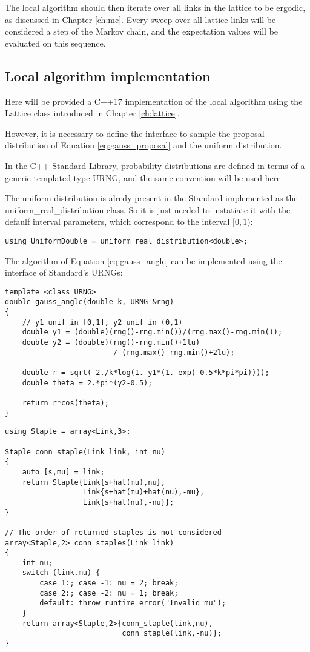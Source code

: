 The local algorithm should then iterate over all links in the lattice to be ergodic, as discussed in Chapter \ref{ch:mc}.
Every sweep over all lattice links will be considered a step of the Markov chain,
and the expectation values will be evaluated on this sequence.

\subsection*{Local algorithm implementation}
Here will be provided a C++17 implementation of the local algorithm using the {\ttfamily Lattice class} introduced in Chapter \ref{ch:lattice}.

However, it is necessary to define the interface to sample the proposal distribution of Equation \eqref{eq:gauss_proposal} and the uniform distribution.

In the C++ Standard Library, probability distributions are defined in terms of a generic templated type {\ttfamily URNG},
and the same convention will be used here.

The uniform distribution is alredy present in the Standard implemented as the {\ttfamily uniform\_real\_distribution} class.
So it is just needed to instatiate it with the defaulf interval parameters, which correspond to the interval $[0,1)$:
\begin{lstlisting}[caption={Uniform distribution sampling function}]
using UniformDouble = uniform_real_distribution<double>;
\end{lstlisting}

The algorithm of Equation \eqref{eq:gauss_angle} can be implemented using the interface of Standard's URNGs:
\begin{lstlisting}[caption={Gaussian angle distribution sampling function}]
template <class URNG>
double gauss_angle(double k, URNG &rng)
{   
    // y1 unif in [0,1], y2 unif in (0,1)
    double y1 = (double)(rng()-rng.min())/(rng.max()-rng.min());
    double y2 = (double)(rng()-rng.min()+1lu)
                         / (rng.max()-rng.min()+2lu);
    
    double r = sqrt(-2./k*log(1.-y1*(1.-exp(-0.5*k*pi*pi))));
    double theta = 2.*pi*(y2-0.5);
    
    return r*cos(theta);
}
\end{lstlisting}


\begin{lstlisting}[caption={Staple type}]
using Staple = array<Link,3>;

Staple conn_staple(Link link, int nu)
{
    auto [s,mu] = link;
    return Staple{Link{s+hat(mu),nu},
                  Link{s+hat(mu)+hat(nu),-mu},
                  Link{s+hat(nu),-nu}};
}

// The order of returned staples is not considered
array<Staple,2> conn_staples(Link link)
{
    int nu;
    switch (link.mu) {
        case 1:; case -1: nu = 2; break;
        case 2:; case -2: nu = 1; break;
        default: throw runtime_error("Invalid mu");
    }
    return array<Staple,2>{conn_staple(link,nu),
                           conn_staple(link,-nu)};
}
\end{lstlisting}

